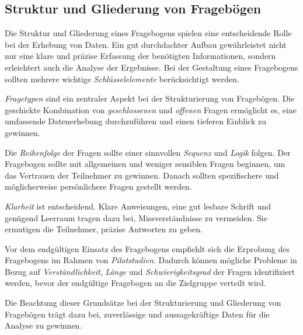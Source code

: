 \subsection{Struktur und Gliederung von Fragebögen}
Die Struktur und Gliederung eines Fragebogens spielen eine entscheidende Rolle bei der Erhebung von Daten. Ein gut
durchdachter Aufbau gewährleistet nicht nur eine klare und präzise Erfassung der benötigten Informationen, sondern
erleichtert auch die Analyse der Ergebnisse. Bei der Gestaltung eines Fragebogens sollten mehrere wichtige \textit{Schlüsselelemente}
berücksichtigt werden.

\textit{Fragetypen} sind ein zentraler Aspekt bei der Strukturierung von Fragebögen. Die geschickte Kombination von
\textit{geschlossenen} und \textit{offenen} Fragen ermöglicht es, eine umfassende Datenerhebung durchzuführen und einen
tieferen Einblick zu gewinnen.

Die \textit{Reihenfolge} der Fragen sollte einer sinnvollen \textit{Sequenz} und \textit{Logik} folgen. Der Fragebogen
sollte mit allgemeinen und weniger sensiblen Fragen beginnen, um das Vertrauen der Teilnehmer zu gewinnen. Danach sollten
spezifischere und möglicherweise persönlichere Fragen gestellt werden.

\textit{Klarheit} ist entscheidend. Klare Anweisungen, eine gut lesbare Schrift und genügend Leerraum tragen dazu bei,
Missverständnisse zu vermeiden. Sie ermutigen die Teilnehmer, präzise Antworten zu geben.

Vor dem endgültigen Einsatz des Fragebogens empfiehlt sich die Erprobung des Fragebogens im Rahmen von \textit{Pilotstudien}.
Dadurch können mögliche Probleme in Bezug auf \textit{Verständlichkeit}, \textit{Länge} und \textit{Schwierigkeitsgrad}
der Fragen identifiziert werden, bevor der endgültige Fragebogen an die Zielgruppe verteilt wird.

Die Beachtung dieser Grundsätze bei der Strukturierung und Gliederung von Fragebögen trägt dazu bei, zuverlässige und
aussagekräftige Daten für die Analyse zu gewinnen.

